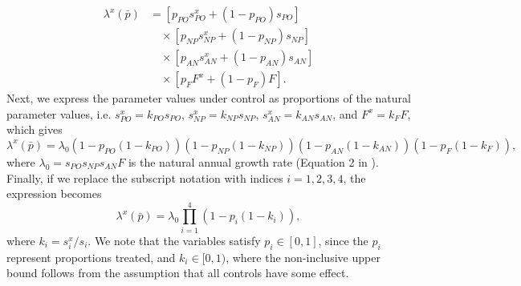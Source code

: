 \documentclass[onecolumn]{article}
\begin{document}
\begin{equation}\label{eq:11}
\begin{aligned}
\lambda^x(\bar{p}) &= [p_{PO} s_{PO}^x + (1 - p_{PO}) s_{PO}] \\
&\quad \times [p_{NP} s_{NP}^x + (1 - p_{NP}) s_{NP}] \\
&\quad \times [p_{AN} s_{AN}^x + (1 - p_{AN}) s_{AN}] \\
&\quad \times [p_{F} F^x + (1 - p_{F}) F].
\end{aligned}
\end{equation}
Next, we express the parameter values under control as proportions of the natural parameter values, i.e. $s_{PO}^x = k_{PO} s_{PO}$, $s_{NP}^x = k_{NP} s_{NP}$, $s_{AN}^x = k_{AN} s_{AN}$, and $F^x = k_{F} F$, which gives
\begin{equation}\label{eq:12} \lambda^x(\bar{p}) = \lambda_0 (1 - p_{PO}(1 - k_{PO}))(1 - p_{NP}(1 - k_{NP}))(1 - p_{AN}(1 - k_{AN}))(1 - p_{F}(1 - k_{F})), \end{equation}
where $\lambda_0 = s_{PO} s_{NP} s_{AN} F$ is the natural annual growth rate (Equation 2 in \citep{Strombom2021}).
Finally, if we replace the subscript notation with indices $i=1,2,3,4$, the expression becomes
\begin{equation}\label{eq:13} \lambda^x(\bar{p}) = \lambda_0 \prod_{i=1}^4 (1 - p_i(1 - k_i)), \end{equation}
where $k_i = s^x_i / s_i$. We note that the variables satisfy $p_i \in [0,1]$, since the $p_i$ represent proportions treated, and $k_i \in [0,1)$, where the non-inclusive upper bound follows from the assumption that all controls have some effect.
\end{document}
